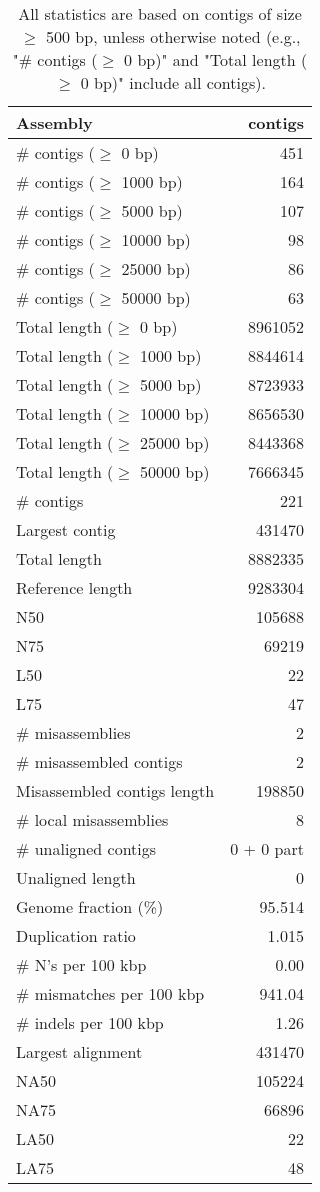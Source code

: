 \documentclass[12pt,a4paper]{article}
\begin{document}
\begin{table}[ht]
\begin{center}
\caption{All statistics are based on contigs of size $\geq$ 500 bp, unless otherwise noted (e.g., "\# contigs ($\geq$ 0 bp)" and "Total length ($\geq$ 0 bp)" include all contigs).}
\begin{tabular}{|l*{1}{|r}|}
\hline
Assembly & contigs \\ \hline
\# contigs ($\geq$ 0 bp) & 451 \\ \hline
\# contigs ($\geq$ 1000 bp) & 164 \\ \hline
\# contigs ($\geq$ 5000 bp) & 107 \\ \hline
\# contigs ($\geq$ 10000 bp) & 98 \\ \hline
\# contigs ($\geq$ 25000 bp) & 86 \\ \hline
\# contigs ($\geq$ 50000 bp) & 63 \\ \hline
Total length ($\geq$ 0 bp) & 8961052 \\ \hline
Total length ($\geq$ 1000 bp) & 8844614 \\ \hline
Total length ($\geq$ 5000 bp) & 8723933 \\ \hline
Total length ($\geq$ 10000 bp) & 8656530 \\ \hline
Total length ($\geq$ 25000 bp) & 8443368 \\ \hline
Total length ($\geq$ 50000 bp) & 7666345 \\ \hline
\# contigs & 221 \\ \hline
Largest contig & 431470 \\ \hline
Total length & 8882335 \\ \hline
Reference length & 9283304 \\ \hline
N50 & 105688 \\ \hline
N75 & 69219 \\ \hline
L50 & 22 \\ \hline
L75 & 47 \\ \hline
\# misassemblies & 2 \\ \hline
\# misassembled contigs & 2 \\ \hline
Misassembled contigs length & 198850 \\ \hline
\# local misassemblies & 8 \\ \hline
\# unaligned contigs & 0 + 0 part \\ \hline
Unaligned length & 0 \\ \hline
Genome fraction (\%) & 95.514 \\ \hline
Duplication ratio & 1.015 \\ \hline
\# N's per 100 kbp & 0.00 \\ \hline
\# mismatches per 100 kbp & 941.04 \\ \hline
\# indels per 100 kbp & 1.26 \\ \hline
Largest alignment & 431470 \\ \hline
NA50 & 105224 \\ \hline
NA75 & 66896 \\ \hline
LA50 & 22 \\ \hline
LA75 & 48 \\ \hline
\end{tabular}
\end{center}
\end{table}
\end{document}

